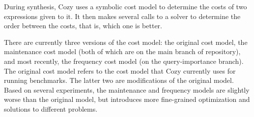 During synthesis, Cozy uses a symbolic cost model to determine the costs of two
expressions given to it. It then makes several calls to a solver to determine
the order between the costs, that is, which one is better.

There are currently three versions of the cost model: the original cost model,
the maintenance cost model (both of which are on the main branch of repository),
and most recently, the frequency cost model (on the query-importance branch).
The original cost model refers to the cost model that Cozy currently uses for
running benchmarks. The latter two are modifications of the original model.
Based on several experiments, the maintenance and frequency models are slightly
worse than the original model, but introduces more fine-grained optimization and
solutions to different problems.
